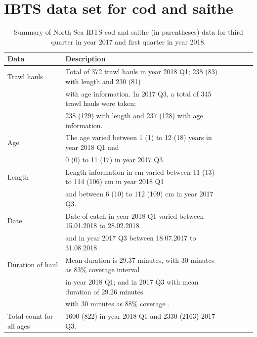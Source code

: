 \documentclass[a4paper 12pt]{article}
\numberwithin{equation}{section}
\begin{document}
\section{\large IBTS data set for cod and saithe}
\label{secAp:data}
\begin{small}
\begin{table}[h!]
\caption{Summary of North Sea IBTS cod and saithe (in parentheses) data for third quarter in year 2017 and first quarter in year 2018.}
\begin{tabular}{llllll}
\toprule
\bf Data&\bf Description \\
\midrule
Trawl hauls  & Total of 372 trawl hauls in year 2018 Q1; 238 (83)  with length and 230 (81) \\ & with age information. In 2017 Q3, a total of 345  trawl hauls were taken; \\ & 238 (129) with length and 237 (128) with age information. \\[1.7ex]

Age &The age varied between 1 (1) to 12 (18) years in year 2018 Q1 and \\ & 0 (0) to 11 (17) in year 2017 Q3. \\[1.7ex]

Length & Length information in cm varied between 11 (13) to 114 (106) cm in year 2018 Q1 \\ & and between 6 (10) to 112 (109) cm in year 2017 Q3. \\[1.7ex]

Date&Date of catch in year 2018 Q1 varied between 15.01.2018 to 28.02.2018 \\ & and in year 2017 Q3 between 18.07.2017 to 31.08.2018 \\[1.7ex]

Duration of haul & Mean duration is 29.37 minutes, with 30 minutes as 83\% coverage interval \\ & in year 2018 Q1; and in 2017 Q3 with mean duration of 29.26 minutes \\ & with 30 minutes as 88\% coverage . \\[1.0ex]

Total count for all ages & 1600 (822) in year 2018 Q1 and 2330 (2163) 2017 Q3. \\[0.5ex]
\bottomrule
\end{tabular}
\label{tab:data2018}
\end{table}
\end{small}
\end{document}
